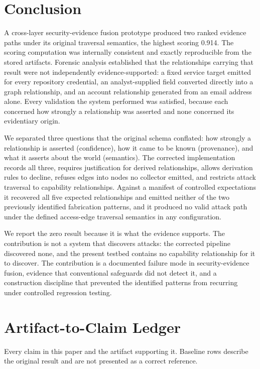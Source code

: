 \documentclass[11pt,a4paper]{article}
\begin{document}
\section{Conclusion}
A cross-layer security-evidence fusion prototype produced two ranked evidence paths under its original traversal semantics, the highest scoring 0.914. The scoring computation was internally consistent and exactly reproducible from the stored artifacts. Forensic analysis established that the relationships carrying that result were not independently evidence-supported: a fixed service target emitted for every repository credential, an analyst-supplied field converted directly into a graph relationship, and an account relationship generated from an email address alone. Every validation the system performed was satisfied, because each concerned how strongly a relationship was asserted and none concerned its evidentiary origin.

We separated three questions that the original schema conflated: how strongly a relationship is asserted (confidence), how it came to be known (provenance), and what it asserts about the world (semantics). The corrected implementation records all three, requires justification for derived relationships, allows derivation rules to decline, refuses edges into nodes no collector emitted, and restricts attack traversal to capability relationships. Against a manifest of controlled expectations it recovered all five expected relationships and emitted neither of the two previously identified fabrication patterns, and it produced no valid attack path under the defined access-edge traversal semantics in any configuration.

We report the zero result because it is what the evidence supports. The contribution is not a system that discovers attacks: the corrected pipeline discovered none, and the present testbed contains no capability relationship for it to discover. The contribution is a documented failure mode in security-evidence fusion, evidence that conventional safeguards did not detect it, and a construction discipline that prevented the identified patterns from recurring under controlled regression testing.

\appendix
\section{Artifact-to-Claim Ledger}
Every claim in this paper and the artifact supporting it. Baseline rows describe the
original result and are not presented as a correct reference.
\end{document}
